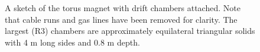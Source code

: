 \begin{figure}[htpb]
\vspace{6.7cm} 
\caption{\small{A sketch of the torus magnet with drift chambers attached.
Note that cable runs and gas lines have been removed for clarity.  The largest
(R3) chambers are approximately equilateral triangular solids with 4 m long sides
and 0.8 m depth.}}
\label{clasview_3d}
\end{figure}
















































